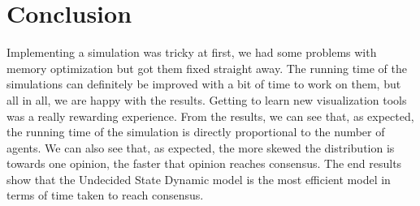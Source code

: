 \section{Conclusion}
\label{Conclusion}
Implementing a simulation was tricky at first, we had some problems with memory optimization but got them fixed straight away. The running time of the simulations can definitely be improved with a bit of time to work on them, but all in all, we are happy with the results. Getting to learn new visualization tools was a really rewarding experience. From the results, we can see that, as expected, the running time of the simulation is directly proportional to the number of agents. We can also see that, as expected, the more skewed the distribution is towards one opinion, the faster that opinion reaches consensus. The end results show that the Undecided State Dynamic model is the most efficient model in terms of time taken to reach consensus.